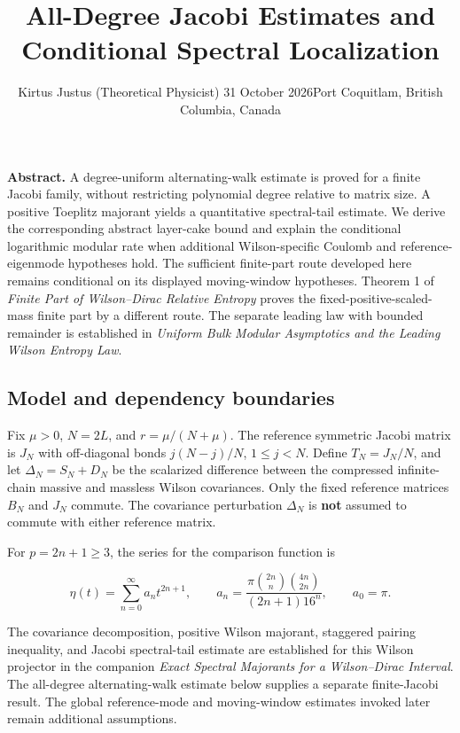 \documentclass[
  10pt,
  a4paper,
]{article}
\title{All-Degree Jacobi Estimates and Conditional Spectral Localization}
\author{Kirtus Justus (Theoretical Physicist) \textbullet{} 31 October 2026\tabularnewline Port Coquitlam, British Columbia, Canada}
\date{}
\begin{document}
\maketitle

\textbf{Abstract.} A degree-uniform alternating-walk estimate is proved for a finite Jacobi family, without restricting polynomial degree relative to matrix size. A positive Toeplitz majorant yields a quantitative spectral-tail estimate. We derive the corresponding abstract layer-cake bound and explain the conditional logarithmic modular rate when additional Wilson-specific Coulomb and reference-eigenmode hypotheses hold. The sufficient finite-part route developed here remains conditional on its displayed moving-window hypotheses. Theorem 1 of \emph{Finite Part of Wilson--Dirac Relative Entropy} proves the fixed-positive-scaled-mass finite part by a different route. The separate leading law with bounded remainder is established in \emph{Uniform Bulk Modular Asymptotics and the Leading Wilson Entropy Law}.

\subsection{Model and dependency boundaries}\label{model-and-dependency-boundaries}

Fix \(\mu>0\), \(N=2L\), and \(r=\mu/(N+\mu)\). The reference symmetric Jacobi matrix is \(J_N\) with off-diagonal bonds \(j(N-j)/N\), \(1\le j<N\). Define \(T_N=J_N/N\), and let \(\Delta_N=S_N+D_N\) be the scalarized difference between the compressed infinite-chain massive and massless Wilson covariances. Only the fixed reference matrices \(B_N\) and \(J_N\) commute. The covariance perturbation \(\Delta_N\) is \textbf{not} assumed to commute with either reference matrix.

For \(p=2n+1\ge 3\), the series for the comparison function is

\[
\eta(t)=\sum_{n=0}^\infty a_n t^{2n+1},\qquad
 a_n=\frac{\pi\binom{2n}{n}\binom{4n}{2n}}{(2n+1)16^n},\qquad a_0=\pi.
\]

The covariance decomposition, positive Wilson majorant, staggered pairing inequality, and Jacobi spectral-tail estimate are established for this Wilson projector in the companion \emph{Exact Spectral Majorants for a Wilson--Dirac Interval}. The all-degree alternating-walk estimate below supplies a separate finite-Jacobi result. The global reference-mode and moving-window estimates invoked later remain additional assumptions.
\end{document}
